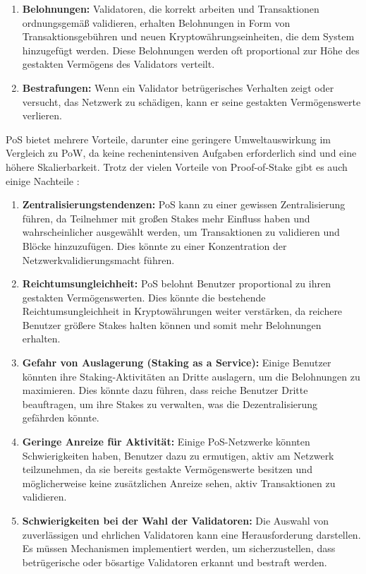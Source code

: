 \begin{itemize}
\begin{enumerate}
		\item \textbf{Belohnungen:} Validatoren, die korrekt arbeiten und Transaktionen ordnungsgemäß validieren, erhalten Belohnungen in Form von Transaktionsgebühren und neuen Kryptowährungseinheiten, die dem System hinzugefügt werden. Diese Belohnungen werden oft proportional zur Höhe des gestakten Vermögens des Validators verteilt.
		
		\item \textbf{Bestrafungen:} Wenn ein Validator betrügerisches Verhalten zeigt oder versucht, das Netzwerk zu schädigen, kann er seine gestakten Vermögenswerte verlieren.
	\end{enumerate}
	PoS \cite{ID53}bietet mehrere Vorteile, darunter eine geringere Umweltauswirkung im Vergleich zu PoW, da keine rechenintensiven Aufgaben erforderlich sind und eine höhere Skalierbarkeit. Trotz der vielen Vorteile von Proof-of-Stake gibt es auch einige Nachteile \cite{ID53}:
	
	\begin{enumerate}
		\item \textbf{Zentralisierungstendenzen:} PoS kann zu einer gewissen Zentralisierung führen, da Teilnehmer mit großen Stakes mehr Einfluss haben und wahrscheinlicher ausgewählt werden, um Transaktionen zu validieren und Blöcke hinzuzufügen. Dies könnte zu einer Konzentration der Netzwerkvalidierungsmacht führen.
		
		\item \textbf{Reichtumsungleichheit:} PoS belohnt Benutzer proportional zu ihren gestakten Vermögenswerten. Dies könnte die bestehende Reichtumsungleichheit in Kryptowährungen weiter verstärken, da reichere Benutzer größere Stakes halten können und somit mehr Belohnungen erhalten.
		
		\item \textbf{Gefahr von Auslagerung (Staking as a Service):} Einige Benutzer könnten ihre Staking-Aktivitäten an Dritte auslagern, um die Belohnungen zu maximieren. Dies könnte dazu führen, dass reiche Benutzer Dritte beauftragen, um ihre Stakes zu verwalten, was die Dezentralisierung gefährden könnte.
		
		\item \textbf{Geringe Anreize für Aktivität:} Einige PoS-Netzwerke könnten Schwierigkeiten haben, Benutzer dazu zu ermutigen, aktiv am Netzwerk teilzunehmen, da sie bereits gestakte Vermögenswerte besitzen und möglicherweise keine zusätzlichen Anreize sehen, aktiv Transaktionen zu validieren.
		
		\item \textbf{Schwierigkeiten bei der Wahl der Validatoren:} Die Auswahl von zuverlässigen und ehrlichen Validatoren kann eine Herausforderung darstellen. Es müssen Mechanismen implementiert werden, um sicherzustellen, dass betrügerische oder bösartige Validatoren erkannt und bestraft werden.
		

\end{enumerate}
\end{itemize}
